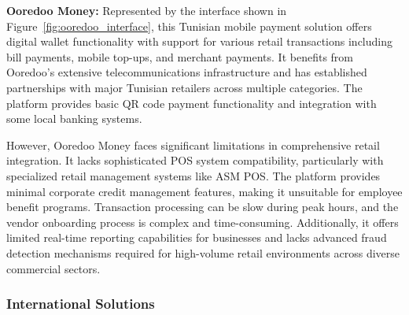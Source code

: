 \textbf{Ooredoo Money:} Represented by the interface shown in Figure~\ref{fig:ooredoo_interface}, this Tunisian mobile payment solution offers digital wallet functionality with support for various retail transactions including bill payments, mobile top-ups, and merchant payments. It benefits from Ooredoo's extensive telecommunications infrastructure and has established partnerships with major Tunisian retailers across multiple categories. The platform provides basic QR code payment functionality and integration with some local banking systems.

However, Ooredoo Money faces significant limitations in comprehensive retail integration. It lacks sophisticated POS system compatibility, particularly with specialized retail management systems like ASM POS. The platform provides minimal corporate credit management features, making it unsuitable for employee benefit programs. Transaction processing can be slow during peak hours, and the vendor onboarding process is complex and time-consuming. Additionally, it offers limited real-time reporting capabilities for businesses and lacks advanced fraud detection mechanisms required for high-volume retail environments across diverse commercial sectors.

\clearpage

\subsubsection{International Solutions}

